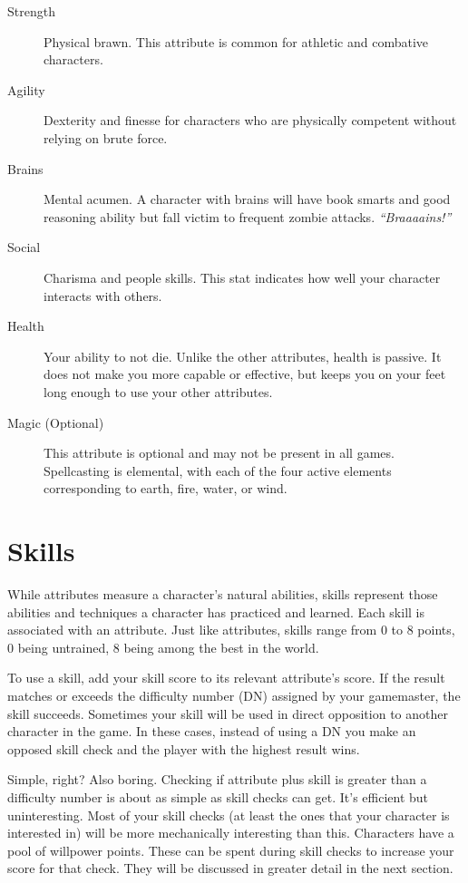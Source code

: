 \documentclass[twocolumn]{report}
\begin{document}
\begin{description}
\item[Strength]
Physical brawn.  This attribute is common for athletic and combative characters.

\item[Agility]
Dexterity and finesse for characters who are physically competent without relying on brute force.

\item[Brains]
Mental acumen.  A character with brains will have book smarts and good reasoning ability but fall victim to frequent zombie attacks. \textit{``Braaaains!''}

\item[Social]
Charisma and people skills.  This stat indicates how well your character interacts with others.

\item[Health]
Your ability to not die.  Unlike the other attributes, health is passive.  It does not make you more capable or effective, but keeps you on your feet long enough to use your other attributes.

\item[Magic (Optional)]
This attribute is optional and may not be present in all games.  Spellcasting is elemental, with each of the four active elements corresponding to earth, fire, water, or wind.

\end{description}

\newpage
\section{Skills}
While attributes measure a character's natural abilities, skills represent those abilities and techniques a character has practiced and learned.  Each skill is associated with an attribute.  Just like attributes, skills range from 0 to 8 points, 0 being untrained, 8 being among the best in the world. 

To use a skill, add your skill score to its relevant attribute's score.  If the result matches or exceeds the difficulty number (DN) assigned by your gamemaster, the skill succeeds.  Sometimes your skill will be used in direct opposition to another character in the game.  In these cases, instead of using a DN you make an opposed skill check and the player with the highest result wins.  

Simple, right?  Also boring.  Checking if attribute plus skill is greater than a difficulty number is about as simple as skill checks can get.  It's efficient but uninteresting.  Most of your skill checks (at least the ones that your character is interested in) will be more mechanically interesting than this.  Characters have a pool of willpower points.  These can be spent during skill checks to increase your score for that check.  They will be discussed in greater detail in the next section.
\end{document}
